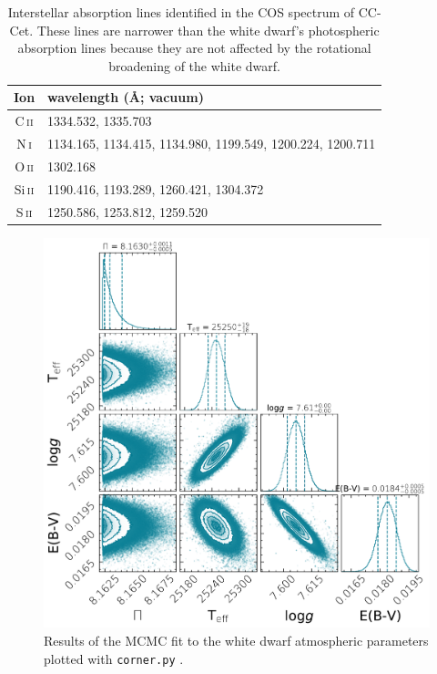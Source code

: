 \documentclass[fleqn,usenatbib]{mnras}
\newcommand{\Ion}[2]{#1{\,\textsc{#2}}}
\begin{document}
\begin{table}
    \centering
    \caption{Interstellar absorption lines identified in the COS spectrum of CC-Cet. These lines are narrower than the white dwarf's photospheric absorption lines because they are not affected by the rotational broadening of the white dwarf.}
    \label{tab:ISlines}
    \begin{tabular}{c l}
        \hline \hline
        Ion & wavelength (\AA; vacuum) \\
        \hline
        \Ion{C}{ii}   & 1334.532, 1335.703\\
        \Ion{N}{i}    & 1134.165, 1134.415, 1134.980, 1199.549, 1200.224, 1200.711\\
        \Ion{O}{ii}   & 1302.168\\
        \Ion{Si}{ii}  & 1190.416, 1193.289, 1260.421, 1304.372\\
        \Ion{S}{ii}   & 1250.586, 1253.812, 1259.520\\
        \hline
    \end{tabular}
\end{table}

\begin{figure}
    \centering
    \includegraphics[width=\columnwidth]{cccet_corner.pdf}
    \caption{Results of the MCMC fit to the white dwarf atmospheric parameters plotted with {\tt corner.py} \citep{corner}.}
    \label{fig:mcmc}
\end{figure}



\bsp	%
\label{lastpage}
\end{document}
